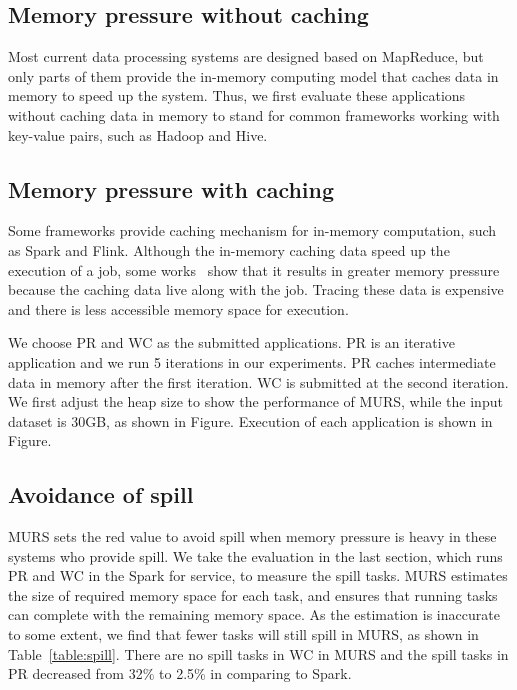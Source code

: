 \subsection{Memory pressure without caching}

Most current data processing systems are designed based on MapReduce, but only parts of them provide the in-memory computing model that caches data in memory to speed up the system. Thus, we first evaluate these applications without caching data in memory to stand for common frameworks working with key-value pairs, such as Hadoop and Hive.

\subsection{Memory pressure with caching}

Some frameworks provide caching mechanism for in-memory computation, such as Spark and Flink. Although the in-memory caching data speed up the execution of a job, some works~\cite{bu:bloat, nguyen2015facade} show that it results in greater memory pressure because the caching data live along with the job. Tracing these data is expensive and there is less accessible memory space for execution.

We choose PR and WC as the submitted applications. PR is an iterative application and we run 5 iterations in our experiments. PR caches intermediate data in memory after the first iteration. WC is submitted at the second iteration. We first adjust the heap size to show the performance of MURS, while the input dataset is 30GB, as shown in Figure. Execution of each application is shown in Figure.

\subsection{Avoidance of spill}

MURS sets the red value to avoid spill when memory pressure is heavy in these systems who provide spill. We take the evaluation in the last section, which runs PR and WC in the Spark for service, to measure the spill tasks. MURS estimates the size of required memory space for each task, and ensures that running tasks can complete with the remaining memory space. As the estimation is inaccurate to some extent, we find that fewer tasks will still spill in MURS, as shown in Table~\ref{table:spill}. There are no spill tasks in WC in MURS and the spill tasks in PR decreased from 32\% to 2.5\% in comparing to Spark.


